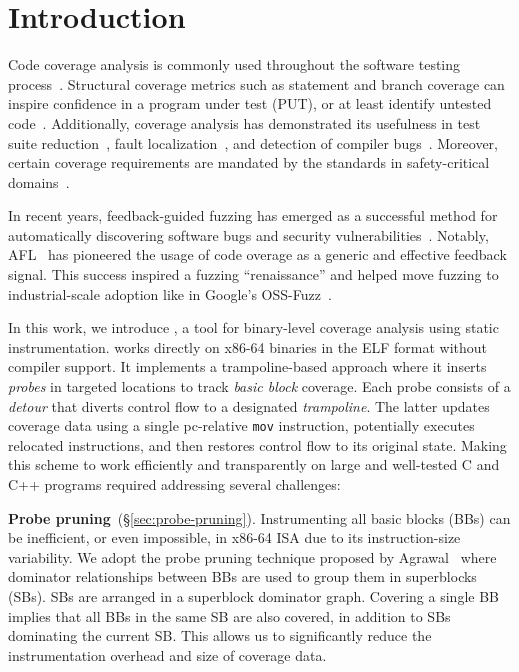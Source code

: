 \section{Introduction}
\label{sec:introduction}

Code coverage analysis is commonly used throughout the software testing process~\cite{Ammann2016}.
Structural coverage metrics such as statement and branch coverage can inspire confidence in a program under test (PUT), or at least identify untested code~\cite{Inozemtseva2014,Gopinath2014}.
Additionally, coverage analysis has demonstrated its usefulness in test suite reduction~\cite{Yoo2010}, fault localization~\cite{Pearson2017}, and detection of compiler bugs~\cite{Le2014}.
Moreover, certain coverage requirements are mandated by the standards in safety-critical domains~\cite{DO178C,ISO26262:2018}.

In recent years, feedback-guided fuzzing has emerged as a successful method for automatically discovering software bugs and security vulnerabilities~\cite{VUzzerRawat2017,kAFL:Schumilo2017,QSYMYun2018,Bohme2016a}. 
Notably, AFL~\cite{ZalewskiAFLWhitePaper} has pioneered the usage of code overage as a generic and effective feedback signal.
This success inspired a fuzzing ``renaissance'' and helped move fuzzing to  industrial-scale adoption like in Google's \mbox{OSS-Fuzz}~\cite{OSSFUZZ}.

In this work, we introduce {\bcov}, a tool for binary-level coverage analysis using static instrumentation.
{\bcov} works directly on x86-64 binaries in the ELF format without compiler support. 
It implements a trampoline-based approach where it inserts \textit{probes} in targeted locations to track \textit{basic block} coverage. 
Each probe consists of a \textit{detour} that diverts control flow to a designated \textit{trampoline}. 
The latter updates coverage data using a single pc-relative \texttt{mov} instruction, potentially executes relocated instructions, and then restores control flow to its original state.
Making this scheme to work efficiently and transparently on large and well-tested C and C++ programs required addressing several challenges:

\textbf{Probe pruning}~(\S\ref{sec:probe-pruning}). 
Instrumenting all basic blocks (BBs) can be inefficient, or even impossible, in x86-64 ISA due to its instruction-size variability.
We adopt the probe pruning technique proposed by Agrawal~\cite{Agrawal1994} where dominator relationships between BBs are used to group them in superblocks (SBs).
SBs are  arranged in a superblock dominator graph.
Covering a single BB implies that all BBs in the same SB are also covered, in addition to SBs dominating the current SB.
This allows us to significantly reduce the instrumentation overhead and size of coverage data.

